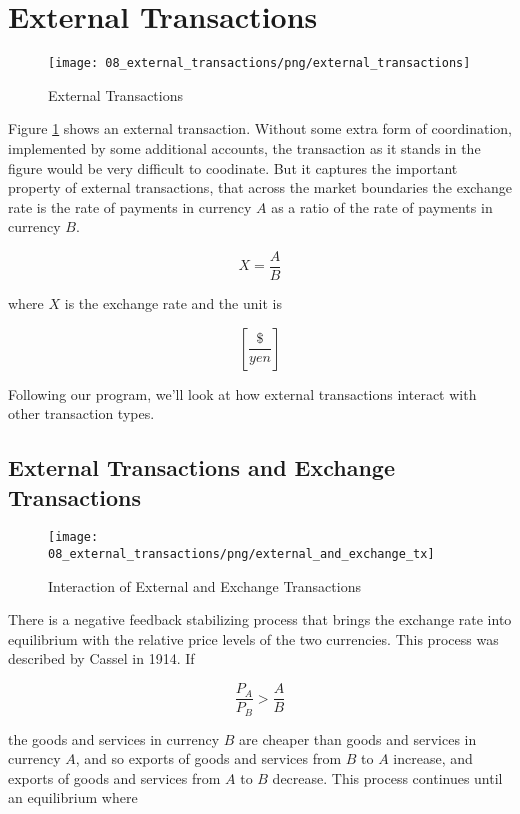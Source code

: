 \section{External Transactions}
\label{sec:external_transactions}

\begin{figure}[H]
\centering
\texttt{[image: 08\_external\_transactions/png/external\_transactions]}
\caption{External Transactions}
\label{fig:external_transactions}
\end{figure}

Figure \ref{fig:external_transactions} shows an external transaction. Without some extra form of
coordination, implemented by some additional accounts, the transaction as it stands in the figure
would be very difficult to coodinate. But it captures the important property of external
transactions, that across the market boundaries the exchange rate is the rate of payments in
currency $A$ as a ratio of the rate of payments in currency $B$.

\[
    X = \frac A  B
\]


where $X$ is the exchange rate and the unit is

\[
    \left[ \frac {\$} {yen} \right]
\]

Following our program, we'll look at how external transactions interact with other transaction
types.

\subsection{External Transactions and Exchange Transactions}

\begin{figure}[H]
\centering
\texttt{[image: 08\_external\_transactions/png/external\_and\_exchange\_tx]}
\caption{Interaction of External and Exchange Transactions}
\label{fig:external_and_exchange_tx}
\end{figure}

There is a negative feedback stabilizing process that brings the exchange rate into equilibrium with
the relative price levels of the two currencies. This process was described by Cassel
\cite{cassel1914} in 1914. If   

\[
    \frac {P_A} {P_B} > \frac A B
\]

the goods and services in currency $B$ are cheaper than goods and services in currency $A$, and so
exports of goods and services from $B$ to $A$ increase, and exports of goods and services from $A$
to $B$ decrease. This process continues until an equilibrium where

